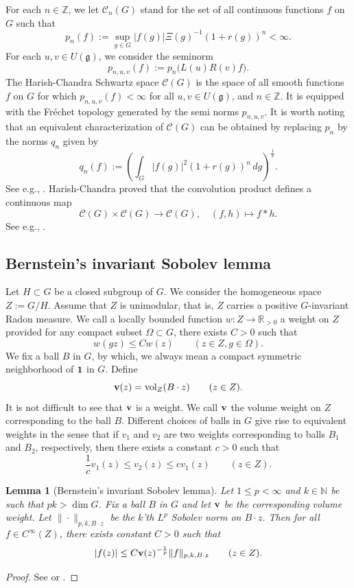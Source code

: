 \documentclass[12pt,letterpaper,titlepage,reqno]{amsart}
\theoremstyle{plain}
\newtheorem{lemma}[theorem]{Lemma}
\theoremstyle{definition}
\numberwithin{equation}{section}
\newcommand{\R}{\mathbb{R}}
\def\gf{\mathfrak{g}}
\begin{document}
For each $n\in \mathbb{Z}$, we let $\mathcal{C}_n(G)$ stand for the set of all continuous functions $f$ on $G$ such that
\begin{equation} \label{pn}
p_n(f)
:=\sup_{g\in G}|f(g)|\Xi(g)^{-1}(1+r(g))^n<\infty.
\end{equation}
For each $u,v \in U(\gf)$, we consider the seminorm
$$
p_{n,u,v}(f)
:= p_n\big(L(u)R(v)f\big).
$$
The Harish-Chandra Schwartz space $\mathcal{C}(G)$ is the space of all smooth functions $f$ on $G$ for which $p_{n,u,v}(f)<\infty$ for all $u,v\in U(\gf)$, and $n\in \mathbb{Z}$. It is equipped with the Fr\'echet topology generated by the semi norms $p_{n,u,v}$. It is worth noting that an equivalent characterization of $\mathcal{C}(G)$ can be obtained by replacing $p_n$ by the norms $q_{n}$ given by
$$
q_n(f)
:= \left(\int_{G}|f(g)|^2(1+r(g))^n\,dg\right)^{\frac12}.
$$
See e.g., \cite[Theorem 9 on page 348]{Var}.
Harish-Chandra proved that the convolution product defines a continuous map
$$
\mathcal{C}(G)\times \mathcal{C}(G)\to \mathcal{C}(G),\quad (f,h)\mapsto f*h.
$$
See e.g., \cite[Theorem 18 on page 357]{Var}.

\subsection{Bernstein's invariant Sobolev lemma}
Let $H\subset G$ be a closed subgroup of $G$. We consider the homogeneous space $Z:= G/H$. Assume that $Z$ is unimodular, that is, $Z$
carries a positive $G$-invariant Radon measure. We call a locally bounded function $w: Z\rightarrow \R_{>0}$ a weight on $Z$ provided for any compact subset $\Omega\subset G$, there exists $C>0$ such that
$$
w(gz)
\leq C w(z)\qquad (z\in Z, g\in \Omega).
$$
We fix a ball $B$ in $G$, by which, we always mean a compact symmetric neighborhood of $\bf{1}$ in $G$. Define
$$
{\bf{v}}(z)
=\text{vol}_{Z}(B\cdot z)\qquad (z\in Z).
$$
It is not difficult to see that $\bf{v}$ is a weight. We call $\bf{v}$ the volume weight on $Z$ corresponding to the ball $B$. Different choices of balls in $G$ give rise to equivalent weights in the sense that if $v_1$ and $v_2$ are two weights corresponding to balls $B_1$ and $B_2$, respectively, then there exists a constant $c>0$ such that
$$
\frac{1}{c} v_1(z)
\leq v_2(z)
\leq c v_1(z)\qquad (z\in Z).
$$

\begin{lemma}[Bernstein's invariant Sobolev lemma]
Let $1\leq p<\infty $ and $k\in \mathbb{N}$ be such that $pk>\dim G$. Fix a ball $B$ in $G$ and let $\bf{v}$ be the corresponding volume weight. Let $\|\cdot\|_{p,k,B\cdot z}$ be the $k$'th $L^{p}$ Sobolev norm on $B\cdot z$. Then for all $f\in C^{\infty}(Z)$, there exists constant $C>0$ such that
$$
|f(z)|
\leq C{\bf{v}}(z)^{-\frac1p}\|f\|_{p,k, B\cdot z}\qquad (z\in Z).
$$
\end{lemma}
\begin{proof} See \cite[Sect. 3.4, Key Lemma]{B} or  \cite[Lemma 4.2]{KSch}. \end{proof}
\end{document}
